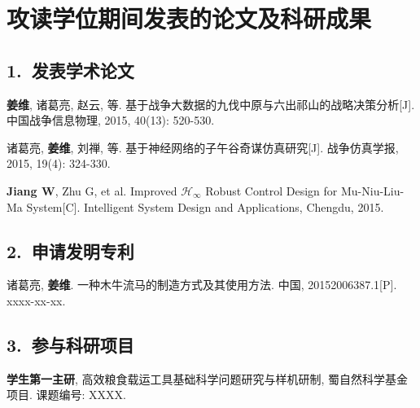 \chapter*{攻读\cDegree{}学位期间发表的论文及科研成果}

\section*{1.~发表学术论文}

\begin{publist}
	\item \textbf{姜维}, 诸葛亮, 赵云, 等. 基于战争大数据的九伐中原与六出祁山的战略决策分析[J]. 中国战争信息物理, 2015, 40(13): 520-530.
	\item 诸葛亮, \textbf{姜维}, 刘禅, 等. 基于神经网络的子午谷奇谋仿真研究[J]. 战争仿真学报, 2015, 19(4): 324-330.
	\item \textbf{Jiang W}, Zhu G, et al. Improved $\mathcal{H}_\infty$ Robust Control Design for Mu-Niu-Liu-Ma System[C]. Intelligent System Design and Applications, Chengdu, 2015.
\end{publist}


	

\section*{2.~申请发明专利}

\begin{publist}
        \item 诸葛亮, \textbf{姜维}. 一种木牛流马的制造方式及其使用方法. 中国, 20152006387.1[P]. xxxx-xx-xx.
\end{publist}

\section*{3.~参与科研项目}

\begin{publist}
	\item \textbf{学生第一主研}, 高效粮食载运工具基础科学问题研究与样机研制, 蜀自然科学基金项目. 课题编号: XXXX.
\end{publist}